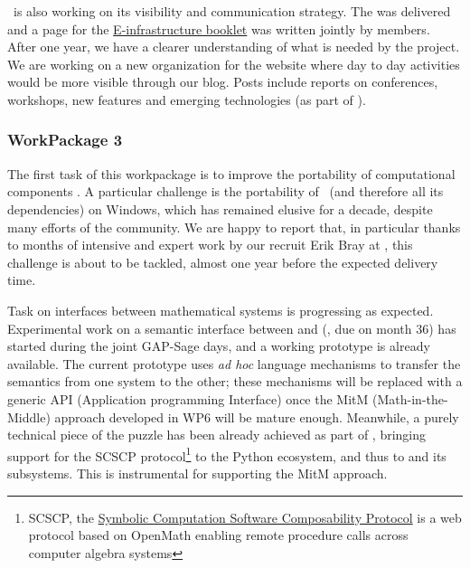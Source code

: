 \documentclass{deliverablereport}
\begin{document}
\begin{itemize}
\ODK\ is also working on its visibility and communication strategy. The
 was delivered and a page for the
\href{https://github.com/OpenDreamKit/OpenDreamKit/blob/master/Communication/eInfra-Booklet/ODK.md}{E-infrastructure
  booklet} was written jointly by \ODK members. After one year, we have a clearer
understanding of what is needed by the project.  We are working on a new organization for
the website where day to day activities would be more visible through our blog. Posts
include reports on conferences, workshops, new features and emerging technologies (as part
of ).


\subsubsection{WorkPackage 3}
The first task of this workpackage is to improve the portability of
computational components
. A particular
challenge is the portability of \Sage\ (and therefore all its
dependencies) on Windows, which has remained elusive for a decade,
despite many efforts of the community. We are happy to report that, in
particular thanks to months of intensive and expert work by our
recruit Erik Bray at , this challenge is about to be
tackled, almost one year before the expected delivery time.

Task  on interfaces
between mathematical systems is progressing as expected. Experimental
work on a semantic interface between \GAP and \Sage
(, due
on month 36) has started during the joint GAP-Sage days, and a working
prototype is already available. The current prototype uses \emph{ad
  hoc} language mechanisms to transfer the semantics from one system
to the other; these mechanisms will be replaced with a generic API
(Application programming Interface) once the MitM (Math-in-the-Middle)
approach developed in WP6 will be mature enough. Meanwhile, a purely
technical piece of the puzzle has been already achieved as part of
, bringing support for the SCSCP
protocol\footnote{SCSCP, the
  \href{http://www.symbolic-computing.org/science/index.php/SCSCP}{Symbolic
    Computation Software Composability Protocol} is a web protocol
  based on OpenMath enabling remote procedure calls across computer
  algebra systems}
to the Python ecosystem, and thus to \Sage and its subsystems. This
is instrumental for supporting the MitM approach.


\end{itemize}
\end{document}
